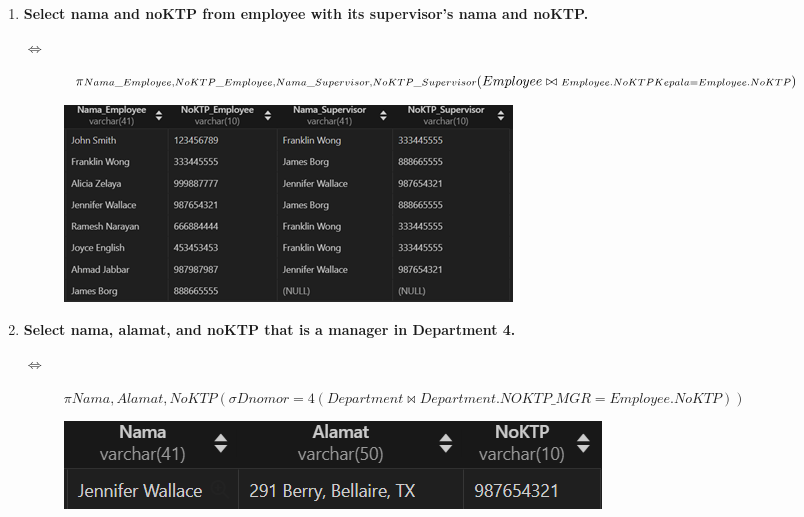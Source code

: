 \documentclass{extarticle}
\begin{document}
\begin{enumerate}
\item {\textbf{Select nama and noKTP from employee with its supervisor’s nama and noKTP.}}
\begin{description} 
    \item[$\Leftrightarrow$] {\large $\pi {\scriptstyle Nama\_Employee,NoKTP\_Employee,Nama\_Supervisor,NoKTP\_Supervisor}\\(Employee \bowtie {\scriptstyle Employee.NoKTPKepala = Employee.NoKTP})$}   
    \item[] \includegraphics[scale=0.7]{3.png}
\end{description}

\item {\textbf{Select nama, alamat, and noKTP that is a manager in Department 4.}}
\begin{description} 
    \item[$\Leftrightarrow$] {\large $\pi {\scriptstyle Nama,Alamat,NoKTP}(\sigma{\scriptstyle Dnomor = 4}(Department \bowtie {\scriptstyle Department.NOKTP\_MGR = Employee.NoKTP}))$}   
    \item[] \includegraphics[scale=0.7]{4.png}
\end{description}

\pagebreak


\end{enumerate}
\end{document}
